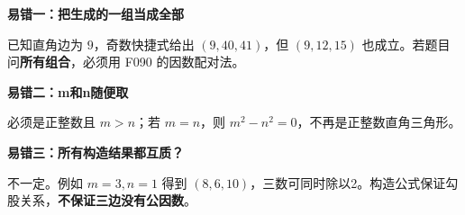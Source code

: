 \clearpage
\begin{trapbox}
\textbf{\textcolor{CTrap}{易错一：把生成的一组当成全部}}
\par\medskip
\begin{center}

\end{center}
\medskip
已知直角边为 $9$，奇数快捷式给出 $(9,40,41)$，但 $(9,12,15)$ 也成立。若题目问\textbf{所有组合}，必须用 F090 的因数配对法。
\end{trapbox}
\clearpage
\begin{trapbox}
\textbf{\textcolor{CTrap}{易错二：m和n随便取}}
\par\medskip
\begin{center}

\end{center}
\medskip
必须是正整数且 $m>n$；若 $m=n$，则 $m^2-n^2=0$，不再是正整数直角三角形。
\end{trapbox}
\clearpage
\begin{trapbox}
\textbf{\textcolor{CTrap}{易错三：所有构造结果都互质？}}
\par\medskip
\begin{center}

\end{center}
\medskip
不一定。例如 $m=3,n=1$ 得到 $(8,6,10)$，三数可同时除以2。构造公式保证勾股关系，\textbf{不保证三边没有公因数}。
\end{trapbox}
